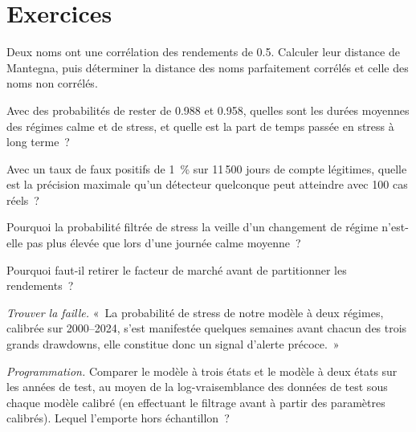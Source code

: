 \section{Exercices}

\begin{exercise}[$\star$]\label{exo:ml:clustering-regimes-and-anomaly-detection:1}
Deux noms ont une corrélation des rendements de 0.5. Calculer leur distance de Mantegna, puis déterminer la distance
des noms parfaitement corrélés et celle des noms non corrélés.
\end{exercise}

\begin{exercise}[$\star$]\label{exo:ml:clustering-regimes-and-anomaly-detection:2}
Avec des probabilités de rester de 0.988 et 0.958, quelles sont les durées moyennes des régimes calme et de stress, et quelle est la
part de temps passée en stress à long terme~?
\end{exercise}

\begin{exercise}[$\star$]\label{exo:ml:clustering-regimes-and-anomaly-detection:3}
Avec un taux de faux positifs de 1~\% sur 11\,500 jours de compte légitimes, quelle est la précision maximale qu'un détecteur quelconque peut atteindre avec 100
cas réels~?
\end{exercise}

\begin{exercise}[$\star\star$]\label{exo:ml:clustering-regimes-and-anomaly-detection:4}
Pourquoi la probabilité filtrée de stress la veille d'un changement de régime n'est-elle pas plus élevée que lors d'une journée calme moyenne~?
\end{exercise}

\begin{exercise}[$\star\star$]\label{exo:ml:clustering-regimes-and-anomaly-detection:5}
Pourquoi faut-il retirer le facteur de marché avant de partitionner les rendements~?
\end{exercise}

\begin{exercise}[$\star\star$]\label{exo:ml:clustering-regimes-and-anomaly-detection:6}
\emph{Trouver la faille.} «~La probabilité de stress de notre modèle à deux régimes, calibrée sur 2000--2024, s'est manifestée quelques semaines avant chacun des
trois grands drawdowns, elle constitue donc un signal d'alerte précoce.~»
\end{exercise}

\begin{exercise}[$\star\star\star$]\label{exo:ml:clustering-regimes-and-anomaly-detection:7}
\emph{Programmation.} Comparer le modèle à trois états et le modèle à deux états sur les années de test, au moyen de la log-vraisemblance des données de test
sous chaque modèle calibré (en effectuant le filtrage avant à partir des paramètres calibrés). Lequel l'emporte hors échantillon~?
\end{exercise}

